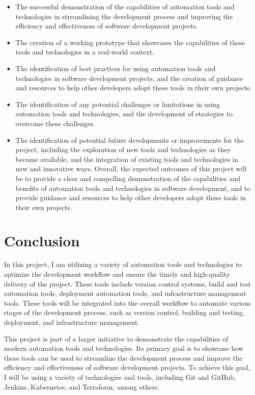 \documentclass[
  10pt,
  paper=a4,
  ,captions=tableheading
]{scrartcl}
\providecommand{\tightlist}{%
  \setlength{\itemsep}{0pt}\setlength{\parskip}{0pt}}
\begin{document}
\begin{itemize}
\tightlist
\item
  The successful demonstration of the capabilities of automation tools
  and technologies in streamlining the development process and improving
  the efficiency and effectiveness of software development projects.
\item
  The creation of a working prototype that showcases the capabilities of
  these tools and technologies in a real-world context.
\item
  The identification of best practices for using automation tools and
  technologies in software development projects, and the creation of
  guidance and resources to help other developers adopt these tools in
  their own projects.
\item
  The identification of any potential challenges or limitations in using
  automation tools and technologies, and the development of strategies
  to overcome these challenges.
\item
  The identification of potential future developments or improvements
  for the project, including the exploration of new tools and
  technologies as they become available, and the integration of existing
  tools and technologies in new and innovative ways. Overall, the
  expected outcomes of this project will be to provide a clear and
  compelling demonstration of the capabilities and benefits of
  automation tools and technologies in software development, and to
  provide guidance and resources to help other developers adopt these
  tools in their own projects.
\end{itemize}

\hypertarget{conclusion-1}{%
\section{Conclusion}\label{conclusion-1}}

In this project, I am utilizing a variety of automation tools and
technologies to optimize the development workflow and ensure the timely
and high-quality delivery of the project. These tools include version
control systems, build and test automation tools, deployment automation
tools, and infrastructure management tools. These tools will be
integrated into the overall workflow to automate various stages of the
development process, such as version control, building and testing,
deployment, and infrastructure management.

This project is part of a larger initiative to demonstrate the
capabilities of modern automation tools and technologies. Its primary
goal is to showcase how these tools can be used to streamline the
development process and improve the efficiency and effectiveness of
software development projects. To achieve this goal, I will be using a
variety of technologies and tools, including Git and GitHub, Jenkins,
Kubernetes, and Terraform, among others.
\end{document}
